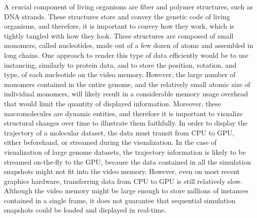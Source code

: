 % 

A crucial component of living organisms are fiber and polymer structures, such as DNA strands.
These structures store and convey the genetic code of living organisms, and therefore, it is important to convey how they work, which is tightly tangled with how they look.
These structures are composed of small monomers, called nucleotides, made out of a few dozen of atoms and assembled in long chains.
One approach to render this type of data efficiently would be to use instancing, similarly to protein data, and to store the position, rotation, and type, of each nucleotide on the video memory.
However, the large number of monomers contained in the entire genome, and the relatively small atomic size of individual monomers, will likely result in a considerable memory usage overhead that would limit the quantity of displayed information.
%
Moreover, these macromolecules are dynamic entities, and therefore it is important to visualize structural changes over time to illustrate them faithfully.
In order to display the trajectory of a molecular dataset, the data must transit from CPU to GPU, either beforehand, or streamed during the visualization.
In the case of visualization of large genome datasets, the trajectory information is likely to be streamed on-the-fly to the GPU, because the data contained in all the simulation snapshots might not fit into the video memory.
However, even on most recent graphics hardware, transferring data from CPU to GPU is still relatively slow.
Although the video memory might be large enough to store millions of instances contained in a single frame, it does not guarantee that sequential simulation snapshots could be loaded and displayed in real-time.

